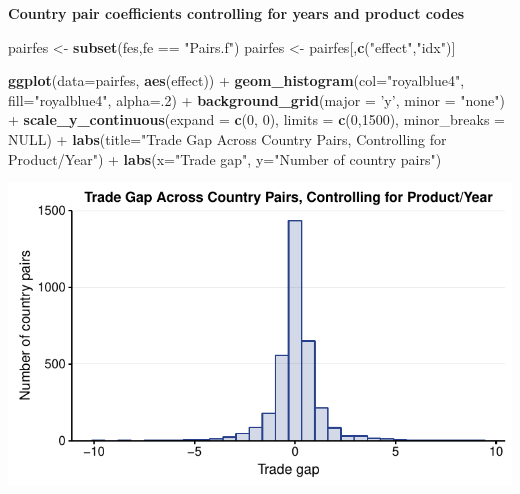 \documentclass[10pt,]{article}
\newenvironment{Shaded}{\begin{snugshade}}{\end{snugshade}}
\newcommand{\KeywordTok}[1]{\textcolor[rgb]{0.13,0.29,0.53}{\textbf{{#1}}}}
\newcommand{\DataTypeTok}[1]{\textcolor[rgb]{0.13,0.29,0.53}{{#1}}}
\newcommand{\DecValTok}[1]{\textcolor[rgb]{0.00,0.00,0.81}{{#1}}}
\newcommand{\StringTok}[1]{\textcolor[rgb]{0.31,0.60,0.02}{{#1}}}
\newcommand{\OtherTok}[1]{\textcolor[rgb]{0.56,0.35,0.01}{{#1}}}
\newcommand{\NormalTok}[1]{{#1}}
\begin{document}
\textbf{Country pair coefficients controlling for years and product
codes}

\begin{Shaded}
\begin{Highlighting}[]
\NormalTok{pairfes <-}\StringTok{ }\KeywordTok{subset}\NormalTok{(fes,fe ==}\StringTok{ "Pairs.f"}\NormalTok{)}
\NormalTok{pairfes <-}\StringTok{ }\NormalTok{pairfes[,}\KeywordTok{c}\NormalTok{(}\StringTok{"effect"}\NormalTok{,}\StringTok{"idx"}\NormalTok{)]}

\KeywordTok{ggplot}\NormalTok{(}\DataTypeTok{data=}\NormalTok{pairfes, }\KeywordTok{aes}\NormalTok{(effect)) +}
\StringTok{  }\KeywordTok{geom_histogram}\NormalTok{(}\DataTypeTok{col=}\StringTok{"royalblue4"}\NormalTok{,}
                 \DataTypeTok{fill=}\StringTok{"royalblue4"}\NormalTok{,}
                 \DataTypeTok{alpha=}\NormalTok{.}\DecValTok{2}\NormalTok{) +}
\StringTok{  }\KeywordTok{background_grid}\NormalTok{(}\DataTypeTok{major =} \StringTok{'y'}\NormalTok{, }\DataTypeTok{minor =} \StringTok{"none"}\NormalTok{) +}
\StringTok{  }\KeywordTok{scale_y_continuous}\NormalTok{(}\DataTypeTok{expand =} \KeywordTok{c}\NormalTok{(}\DecValTok{0}\NormalTok{, }\DecValTok{0}\NormalTok{), }\DataTypeTok{limits =} \KeywordTok{c}\NormalTok{(}\DecValTok{0}\NormalTok{,}\DecValTok{1500}\NormalTok{), }\DataTypeTok{minor_breaks =} \OtherTok{NULL}\NormalTok{) +}
\StringTok{  }\KeywordTok{labs}\NormalTok{(}\DataTypeTok{title=}\StringTok{"Trade Gap Across Country Pairs, Controlling for Product/Year"}\NormalTok{) +}
\StringTok{  }\KeywordTok{labs}\NormalTok{(}\DataTypeTok{x=}\StringTok{"Trade gap"}\NormalTok{, }\DataTypeTok{y=}\StringTok{"Number of country pairs"}\NormalTok{)}
\end{Highlighting}
\end{Shaded}

\begin{center}\includegraphics{Figs/value_pairs_reg-1} \end{center}
\end{document}
